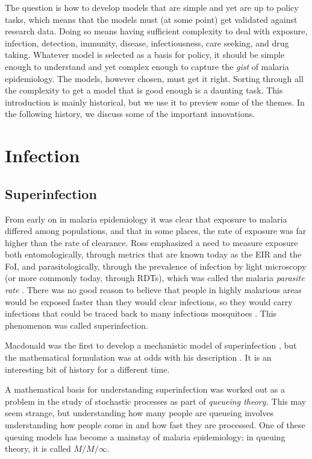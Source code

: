 \documentclass[
]{book}
\begin{document}
The question is how to develop models that are simple and yet are up to policy tasks, which means that the models must (at some point) get validated against research data. Doing so means having sufficient complexity to deal with exposure, infection, detection, immunity, disease, infectiousness, care seeking, and drug taking. Whatever model is selected as a basis for policy, it should be simple enough to understand and yet complex enough to capture the \emph{gist} of malaria epidemiology. The models, however chosen, must get it right. Sorting through all the complexity to get a model that is good enough is a daunting task. This introduction is mainly historical, but we use it to preview some of the themes. In the following history, we discuss some of the important innovations.

\section{Infection}\label{infection-1}

\subsection{Superinfection}\label{superinfection-1}

From early on in malaria epidemiology it was clear that exposure to malaria differed among populations, and that in some places, the rate of exposure was far higher than the rate of clearance. Ross emphasized a need to measure exposure both entomologically, through metrics that are known today as the EIR and the FoI, and parasitologically, through the prevalence of infection by light microscopy (or more commonly today, through RDTs), which was called the malaria \emph{parasite rate} . There was no good reason to believe that people in highly malarious areas would be exposed faster than they would clear infections, so they would carry infections that could be traced back to many infectious mosquitoes \autocite{WaltonGA1947ControlMalaria}. This phenomenon was called superinfection.

Macdonald was the first to develop a mechanistic model of superinfection \autocite{MacdonaldG1950Superinfection}, but the mathematical formulation was at odds with his description \autocite{FinePEM1975SuperinfectionProblem}. It is an interesting bit of history for a different time.

A mathematical basis for understanding superinfection was worked out as a problem in the study of stochastic processes as part of \emph{queueing theory.} This may seem strange, but understanding how many people are queueing involves understanding how people come in and how fast they are processed. One of these queuing models has become a mainstay of malaria epidemiology; in queuing theory, it is called \(M/M/\infty\).
\end{document}
